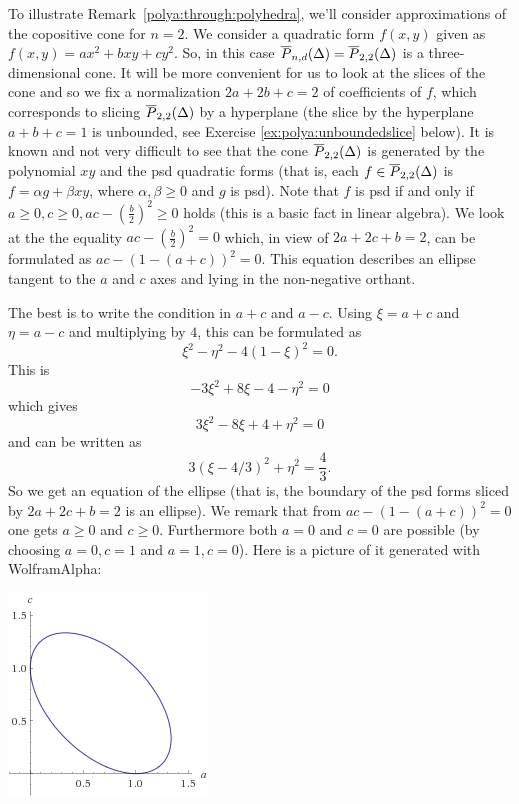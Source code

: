 \begin{example}
	To illustrate Remark~\ref{polya:through:polyhedra}, we'll consider approximations of the copositive cone for $n=2$.  We consider a quadratic form $f(x,y)$ given as $f(x,y) = a x^2 +  b x y + c y^2$. So, in this case $\overline{P}_{n,d}(\Delta)= \overline{P}_{2,2}(\Delta)$ is a three-dimensional cone. It will be more convenient for us to look at the slices of the cone and so we fix a normalization $2 a + 2 b + c =2$ of coefficients of $f$, which corresponds to slicing $\overline{P}_{2,2}(\Delta)$ by a hyperplane (the slice by the hyperplane $a + b + c=1$ is unbounded, see Exercise \ref{ex:polya:unboundedslice} below). It is known and not very difficult to see that the cone $\overline{P}_{2,2}(\Delta)$ is generated by the polynomial $xy$ and the psd quadratic forms (that is, each $f\in \overline{P}_{2,2}(\Delta)$ is $f = \alpha g + \beta xy$, where $\alpha, \beta \ge 0$ and $g$ is psd). Note that $f$ is psd if and only if $a \ge 0, c \ge 0, a c - (\frac{b}{2})^2 \ge 0$ holds (this is a basic fact in linear algebra). We look at the the equality $a c - (\frac{b}{2})^2 =0$ which, in view of $2a + 2c + b=2$, can be formulated as $a c - (1- (a+c))^2 = 0$. This equation describes an ellipse tangent to the $a$ and $c$ axes and lying in the non-negative orthant. 
	
	The best is to write the condition in $a+c$ and $a -c$. Using $\xi=a+c$ and $\eta = a-c$ and multiplying by $4$, this can be formulated as
	\[
		\xi^2 - \eta^2 - 4 (1- \xi)^2 = 0.
	\]
	This is
	\[
		- 3 \xi^2  + 8 \xi - 4 - \eta^2 = 0
	\]
	which gives
	\[
		3 \xi^2 - 8 \xi + 4 + \eta^2 = 0
	\]
	and can be written as
	\[
		3 (\xi - 4/3)^2 + \eta^2 = \frac{4}{3}.
	\]
	So we get an equation of the ellipse (that is, the boundary of the psd forms sliced by $2a+2c+b=2$ is an ellipse). We remark that from $a c - (1 - (a+c))^2 = 0$ one gets $a \ge 0$ and $c \ge 0$. Furthermore both $a =0$ and $c=0$ are possible (by choosing $a=0, c=1$ and $a=1, c = 0$). Here is a picture of it generated with WolframAlpha:
	\begin{center}
		\includegraphics[width=150pt]{sdp_ellipse}
	\end{center}
	

\end{example}
